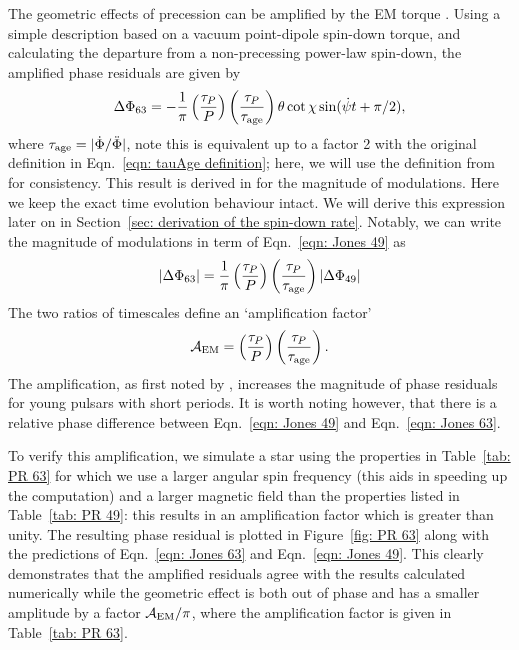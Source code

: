 \documentclass[../full_thesis/full_thesis.tex]{subfiles}
\begin{document}
The geometric effects of precession can be amplified by the EM torque \citep{Cordes1993}.
Using a simple description based on a vacuum point-dipole spin-down torque,
and calculating the departure from a non-precessing power-law spin-down,
the amplified phase residuals are given by
\begin{align}
\Delta\Phi_{63} = -\frac{1}{\pi}\left(\frac{\tau_{P}}{P}\right)
                               \left(\frac{\tau_{P}}{\tau_{\mathrm{age}}}\right)
                               \theta
                               \cot\chi
                               \sin(\dot{\psi} t + \pi/2),
\label{eqn: Jones 63}
\end{align}
where $\tau_{\mathrm{age}}=|\dot{\Phi}/\ddot{\Phi}|$, note this is equivalent up to a factor
2 with the original definition in Eqn.~\eqref{eqn: tauAge definition}; here,
we will use the definition from \citet{Jones2001} for consistency.
This result is derived in \citet{Jones2001} for the magnitude of modulations.
Here we keep the exact time evolution behaviour intact. We will derive this
expression later on in Section~\ref{sec: derivation of the spin-down rate}.
Notably, we can write the magnitude of modulations in term of Eqn.~\eqref{eqn:
Jones 49} as
\begin{equation}
    |\Delta\Phi_{63}| = \frac{1}{\pi}\left(\frac{\tau_{P}}{P}\right)
    \left(\frac{\tau_{P}}{\tau_{\mathrm{age}}}\right)
                                    |\Delta\Phi_{49}|
\label{eqn: Jones 63 mag}
\end{equation}
The two ratios of timescales define an `amplification factor'
\begin{equation}
    \mathcal{A}_{\mathrm{EM}} = \left(\frac{\tau_{P}}{P}\right)
                                \left(\frac{\tau_{P}}{\tau_{\mathrm{age}}}\right).
\label{eqn: EM amplification}
\end{equation}
The amplification, as first noted by \citet{Cordes1993}, increases the
magnitude of phase residuals for young pulsars with short periods. It is worth
noting however, that there is a relative phase difference between
Eqn.~\eqref{eqn: Jones 49} and Eqn.~\eqref{eqn: Jones 63}.

To verify this amplification, we simulate a star using the properties in
Table~\ref{tab: PR 63} for which we use a larger angular spin frequency (this
aids in speeding up the computation) and a
larger magnetic field than the properties listed in Table~\ref{tab: PR 49}:
this results in an amplification factor which is greater than unity.  The
resulting phase residual is plotted in Figure~\ref{fig: PR 63} along with the
predictions of Eqn.~\eqref{eqn: Jones 63} and Eqn.~\eqref{eqn: Jones 49}. This
clearly demonstrates that the amplified residuals agree with the results
calculated numerically while the geometric effect is both out of phase and
has a smaller amplitude by a factor $\mathcal{A}_{\mathrm{EM}}/\pi$, where the amplification factor is
given in Table~\ref{tab: PR 63}.
\end{document}
